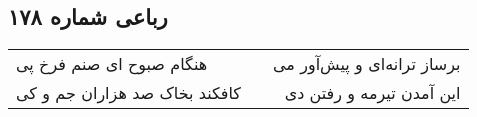 \begin{center}
\section*{رباعی شماره ۱۷۸}
\label{sec:sh178}
\begin{longtable}{l p{0.5cm} r}
هنگام صبوح ای صنم فرخ پی
&&
برساز ترانه‌ای و پیش‌آور می
\\
کافکند بخاک صد هزاران جم و کی
&&
این آمدن تیرمه و رفتن دی
\\
\end{longtable}
\end{center}
